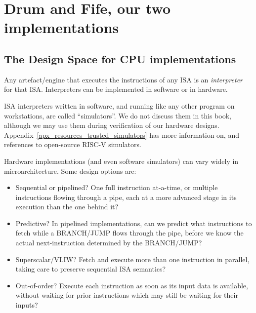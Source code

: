 \vspace{1ex}



\section{Drum and Fife, our two implementations}

\label{Sec_Drum_and_Fife}


\subsection{The Design Space for CPU implementations}

\label{Sec_Interpreters}

Any artefact/engine that executes the instructions of any ISA is an
\emph{interpreter} for that ISA.  Interpreters can be implemented in
software or in hardware.

ISA interpreters written in software, and running like any other
program on workstations, are called ``simulators''.  We do not discuss
them in this book, although we may use them during verification of our
hardware designs.  Appendix~\ref{apx_resources_trusted_simulators} has
more information on, and references to open-source RISC-V simulators.

Hardware implementations (and even software simulators) can vary
widely in microarchitecture.  Some design options are:

\begin{itemize}

  \item Sequential or pipelined?  One full instruction at-a-time, or
    multiple instructions flowing through a pipe, each at a more
    advanced stage in its execution than the one behind it?

  \item Predictive? In pipelined implementations, can we predict what
    instructions to fetch while a BRANCH/JUMP flows through the pipe,
    before we know the actual next-instruction determined by the
    BRANCH/JUMP?

  \item Superscalar/VLIW? Fetch and execute more than one instruction
    in parallel, taking care to preserve sequential ISA semantics?

  \item Out-of-order? Execute each instruction as soon as its input
    data is available, without waiting for prior instructions which
    may still be waiting for their inputs?

\end{itemize}

